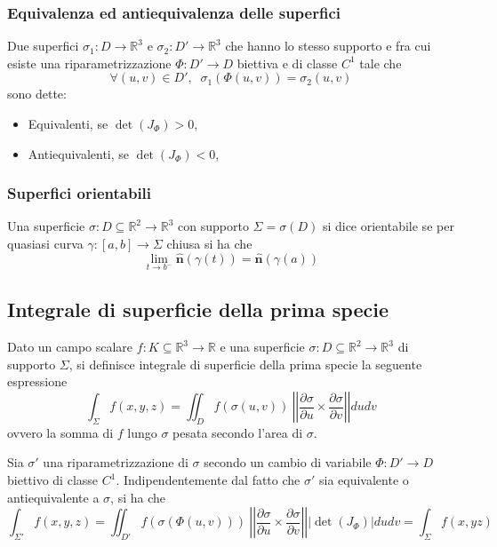         \subsubsection{Equivalenza ed antiequivalenza delle superfici}
            Due superfici $\sigma_{1}: D \rightarrow \mathbb{R}^{3}$ e $\sigma_{2}: D' \rightarrow \mathbb{R}^{3}$ che hanno lo stesso supporto e fra cui esiste una riparametrizzazione $\Phi: D' \rightarrow D$ biettiva e di classe $C^{1}$ tale che
            \[
                \forall (u, v) \in D', \;\; \sigma_{1}(\Phi(u, v)) = \sigma_{2}(u, v)
            \]
            sono dette:
            \begin{itemize}
                \item Equivalenti, se $\det(J_{\Phi}) > 0$,
                \item Antiequivalenti, se $\det(J_{\Phi}) < 0$,
            \end{itemize}

        \subsubsection{Superfici orientabili}
            Una superficie $\sigma: D \subseteq \mathbb{R}^{2} \rightarrow \mathbb{R}^{3}$ con supporto $\Sigma = \sigma(D)$ si dice orientabile se per quasiasi curva $\gamma: [a, b] \rightarrow \Sigma$ chiusa si ha che
            \[
                \lim_{t \rightarrow b^{-}} \mathbf{\hat{n}}(\gamma(t)) = \mathbf{\hat{n}}(\gamma(a))
            \]

    \subsection{Integrale di superficie della prima specie}
        Dato un campo scalare $f: K \subseteq \mathbb{R}^{3} \rightarrow \mathbb{R}$ e una superficie $\sigma: D \subseteq \mathbb{R}^{2} \rightarrow \mathbb{R}^{3}$ di supporto $\Sigma$, si definisce integrale di superficie della prima specie la seguente espressione
        \[
            \int_{\Sigma} f(x, y, z) = \iint_{D} f(\sigma(u, v)) \: \left|\left| \frac{\partial \sigma}{\partial u} \times \frac{\partial \sigma}{\partial v} \right|\right| du dv
        \]
        ovvero la somma di $f$ lungo $\sigma$ pesata secondo l'area di $\sigma$.

        Sia $\sigma'$ una riparametrizzazione di $\sigma$ secondo un cambio di variabile $\Phi: D' \rightarrow D$ biettivo di classe $C^{1}$.
        Indipendentemente dal fatto che $\sigma'$ sia equivalente o antiequivalente a $\sigma$, si ha che
        \[
            \int_{\Sigma'} f(x, y, z) = \iint_{D'} f(\sigma(\Phi(u, v))) \: \left|\left| \frac{\partial \sigma}{\partial u} \times \frac{\partial \sigma}{\partial v} \right|\right| | \det(J_{\Phi}) | du dv = \int_{\Sigma} f(x, y z)
        \]

